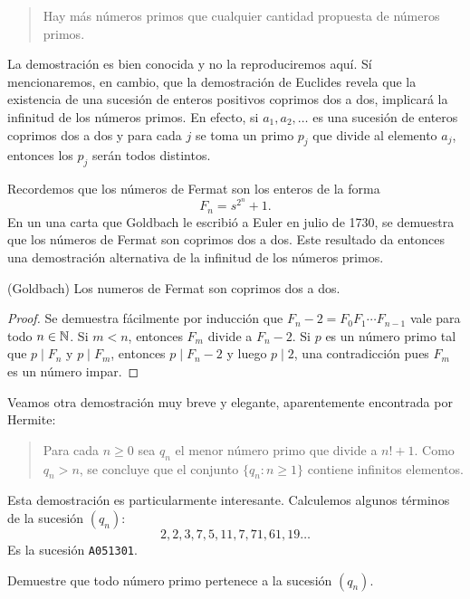 \begin{quote}
	Hay más números primos que cualquier cantidad propuesta de números primos.
\end{quote}
La demostración es bien conocida y no la reproduciremos aquí. Sí mencionaremos,
en cambio, que la demostración de Euclides revela que la existencia de una
sucesión de enteros positivos coprimos dos a dos, implicará la infinitud de los
números primos. En efecto, si $a_1,a_2,\dots$ es una sucesión de enteros
coprimos dos a dos y para cada $j$ se toma un primo $p_j$ que divide al
elemento $a_j$, entonces los $p_j$ serán todos distintos.

Recordemos que los números de Fermat son los enteros de la forma
\[
	F_n=s^{2^n}+1.
\]
En un una carta que Goldbach le escribió a Euler en julio de 1730, se demuestra
que los números de Fermat son coprimos dos a dos. Este resultado da entonces
una demostración alternativa de la infinitud de los números primos.

\begin{theorem}(Goldbach)
	Los numeros de Fermat son coprimos dos a dos.
\end{theorem}

\begin{proof}
	Se demuestra fácilmente por inducción que $F_n-2=F_0F_1\cdots F_{n-1}$ vale
	para todo $n\in\mathbb{N}$. Si $m<n$, entonces $F_m$ divide a $F_n-2$. Si $p$ es un
	número primo tal que $p\mid F_n$ y $p\mid F_m$, entonces $p\mid F_n-2$ y
	luego $p\mid 2$, una contradicción pues $F_m$ es un número impar. 
\end{proof}

Veamos otra demostración muy breve y elegante, aparentemente encontrada por Hermite:

\begin{quote}
Para cada $n\geq0$ sea $q_n$ el menor número primo que divide a $n!+1$. Como
$q_n>n$, se concluye que el conjunto $\{q_n:n\geq1\}$ contiene infinitos elementos.
\end{quote}
Esta demostración es particularmente interesante. Calculemos algunos
términos de la sucesión $(q_n)$:
\[
	2,2,3,7,5,11,7,71,61,19\dots
\]
Es la sucesión \verb+A051301+. 

\begin{exercise}
	Demuestre que todo número primo pertenece a la sucesión $(q_n)$.
\end{exercise}


